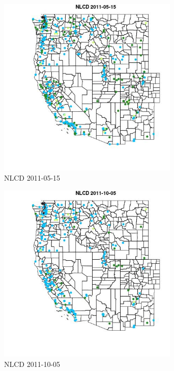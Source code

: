 \begin{figure} 
\centering  
\includegraphics[width=0.77\textwidth]{Code_Outputs/ML_input_report_ML_input_PM25_Step5_part_d_de_duplicated_aves_ML_input_MapObsNLCD2011-05-15.jpg} 
\caption{\label{fig:ML_input_report_ML_input_PM25_Step5_part_d_de_duplicated_aves_ML_inputMapObsNLCD2011-05-15}NLCD 2011-05-15} 
\end{figure} 
 

\begin{figure} 
\centering  
\includegraphics[width=0.77\textwidth]{Code_Outputs/ML_input_report_ML_input_PM25_Step5_part_d_de_duplicated_aves_ML_input_MapObsNLCD2011-10-05.jpg} 
\caption{\label{fig:ML_input_report_ML_input_PM25_Step5_part_d_de_duplicated_aves_ML_inputMapObsNLCD2011-10-05}NLCD 2011-10-05} 
\end{figure} 
 
